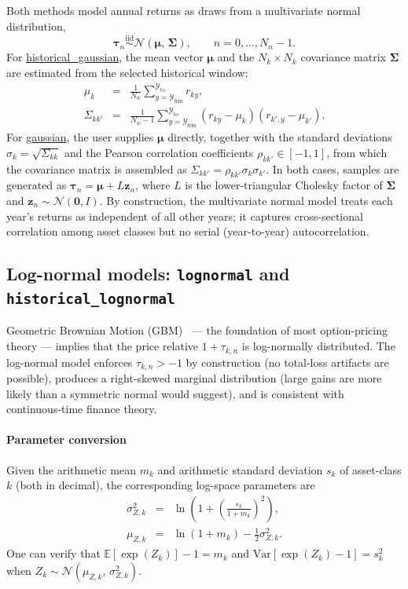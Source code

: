 \documentclass[fleqn,12pt]{report}
\newcommand{\code}[1]{\url{#1}}
\begin{document}
Both methods model annual returns as draws from a multivariate normal
distribution,
\begin{equation}
    \bm{\tau}_n \overset{\mathrm{iid}}{\sim}
    \mathcal{N}(\bm{\mu},\,\bm{\Sigma}),
    \qquad n = 0, \ldots, N_n - 1.
\end{equation}
For \code{historical_gaussian}, the mean vector $\bm{\mu}$ and the
$N_k \times N_k$ covariance matrix $\bm{\Sigma}$ are estimated from the
selected historical window:
\begin{eqnarray}
    \mu_k &=& \frac{1}{N_w}
              \sum_{y=\mathcal{Y}_{\mathrm{frm}}}^{\mathcal{Y}_{\mathrm{to}}} r_{ky},
    \\
    \Sigma_{kk'} &=& \frac{1}{N_w-1}
              \sum_{y=\mathcal{Y}_{\mathrm{frm}}}^{\mathcal{Y}_{\mathrm{to}}}
              (r_{ky} - \mu_k)(r_{k',y} - \mu_{k'}).
\end{eqnarray}
For \code{gaussian}, the user supplies $\bm{\mu}$ directly, together
with the standard deviations $\sigma_k = \sqrt{\Sigma_{kk}}$ and the Pearson
correlation coefficients $\rho_{kk'} \in [-1,1]$, from which the covariance
matrix is assembled as $\Sigma_{kk'} = \rho_{kk'}\sigma_k\sigma_{k'}$.
In both cases, samples are generated as $\bm{\tau}_n = \bm{\mu} + L\bm{z}_n$,
where $L$ is the lower-triangular Cholesky factor of $\bm{\Sigma}$ and
$\bm{z}_n \sim \mathcal{N}(\mathbf{0}, I)$.
By construction, the multivariate normal model treats each year's returns as
independent of all other years; it captures cross-sectional correlation
among asset classes but no serial (year-to-year) autocorrelation.

\subsection{Log-normal models: \texttt{lognormal} and \texttt{historical\_lognormal}}

Geometric Brownian Motion (GBM)~\cite{hull2017} --- the foundation of most
option-pricing theory --- implies that the price relative $1 + \tau_{k,n}$
is log-normally distributed.
The log-normal model enforces $\tau_{k,n} > -1$ by construction (no
total-loss artifacts are possible), produces a right-skewed marginal
distribution (large gains are more likely than a symmetric normal would
suggest), and is consistent with continuous-time finance theory.

\paragraph*{Parameter conversion}
Given the arithmetic mean $m_k$ and arithmetic standard deviation $s_k$
of asset-class $k$ (both in decimal), the corresponding log-space parameters
are~\cite{hull2017}
\begin{eqnarray}
    \sigma_{Z,k}^2 &=& \ln\!\left(1 + \left(\frac{s_k}{1+m_k}\right)^{\!2}\right),
    \label{Eq:sigmaZ}\\
    \mu_{Z,k}      &=& \ln(1 + m_k) - \tfrac{1}{2}\sigma_{Z,k}^2.
    \label{Eq:muZ}
\end{eqnarray}
One can verify that $\mathbb{E}[\exp(Z_k)] - 1 = m_k$ and
$\mathrm{Var}[\exp(Z_k) - 1] = s_k^2$ when
$Z_k \sim \mathcal{N}(\mu_{Z,k},\,\sigma_{Z,k}^2)$.
\end{document}
